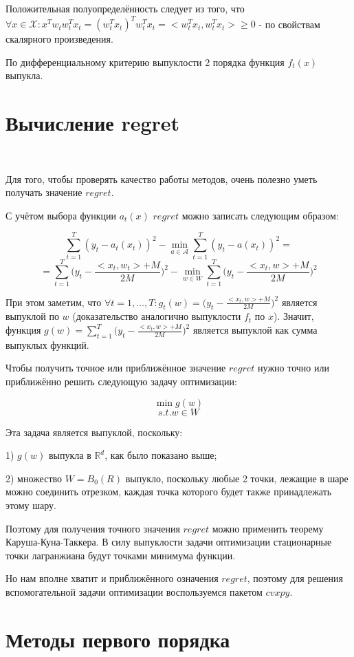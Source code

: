 \documentclass[12pt]{article}
\theoremstyle{definition}
\begin{document}
Положительная полуопределённость следует из того, что $\forall x \in \mathcal{X}: x^Tw_tw_t^Tx_t = (w_t^Tx_t)^Tw_t^Tx_t = <w_t^Tx_t, w_t^Tx_t> \geq 0$ - по свойствам скалярного произведения.

По дифференциальному критерию выпуклости 2 порядка функция $f_t(x)$ выпукла. 

\section*{Вычисление regret}
$ $

Для того, чтобы проверять качество работы методов, очень полезно уметь получать значение $regret$.

С учётом выбора функции $a_t(x)$ $regret$ можно записать следующим образом:

$$\sum\limits_{t=1}^T (y_t-a_t(x_t))^2 - \min\limits_{a \in \mathcal{A}} \sum\limits_{t=1}^T (y_t-a(x_t))^2 =$$
$$= \sum\limits_{t=1}^T\bigg(y_t - \frac{<x_t, w_t>+M}{2M}\bigg)^2 - \min\limits_{w \in W}\sum\limits_{t=1}^T\bigg(y_t - \frac{<x_t, w>+M}{2M}\bigg)^2$$

При этом заметим, что $\forall t=1, \dots, T: g_t(w) = \bigg(y_t - \frac{<x_t, w>+M}{2M}\bigg)^2$ является выпуклой по $w$ (доказательство аналогично выпуклости $f_t$ по $x$).
Значит, функция $g(w) = \sum\limits_{t=1}^T\bigg(y_t - \frac{<x_t, w>+M}{2M}\bigg)^2$ является выпуклой как сумма выпуклых функций.

Чтобы получить точное или приближённое значение $regret$ нужно точно или приближённо решить следующую задачу оптимизации:

$$\min g(w)$$
$$s.t. w \in W$$

Эта задача является выпуклой, поскольку:

1) $g(w)$ выпукла в $\mathbb{R}^d$, как было показано выше;

2) множество $W = B_0(R)$ выпукло, поскольку любые 2 точки, лежащие в шаре можно соединить отрезком, каждая точка которого будет также принадлежать этому шару.


Поэтому для получения точного значения $regret$ можно применить теорему Каруша-Куна-Таккера. В силу выпуклости задачи  оптимизации стационарные точки лагранжиана будут точками минимума функции. 

Но нам вполне хватит и приближённого означения $regret$, поэтому для решения вспомогательной задачи оптимизации воспользуемся пакетом $cvxpy$.

\section*{Методы первого порядка}
$ $
\end{document}
